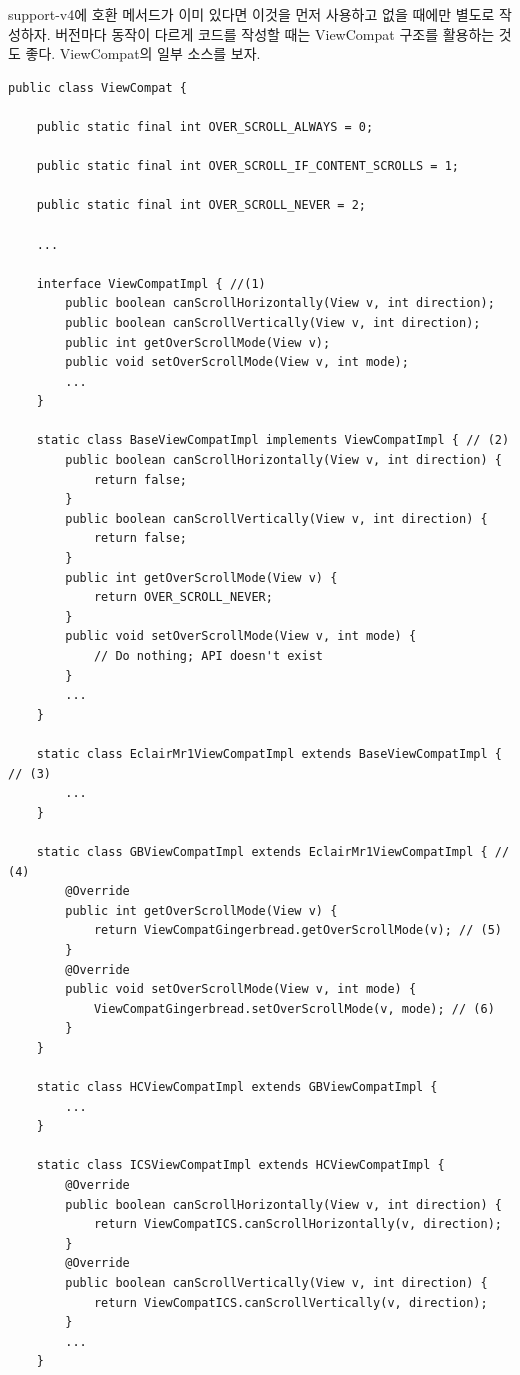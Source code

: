 support-v4에 호환 메서드가 이미 있다면 이것을 먼저 사용하고 없을 때에만 별도로 작성하자.
버전마다 동작이 다르게 코드를 작성할 때는 ViewCompat 구조를 활용하는 것도 좋다. ViewCompat의 일부 소스를 보자. 
\begin{lstlisting}[frame=single]
public class ViewCompat {
   
    public static final int OVER_SCROLL_ALWAYS = 0;

    public static final int OVER_SCROLL_IF_CONTENT_SCROLLS = 1;

    public static final int OVER_SCROLL_NEVER = 2;
    
    ...
    
    interface ViewCompatImpl { //(1)
        public boolean canScrollHorizontally(View v, int direction);
        public boolean canScrollVertically(View v, int direction);
        public int getOverScrollMode(View v);
        public void setOverScrollMode(View v, int mode);
        ...
    }

    static class BaseViewCompatImpl implements ViewCompatImpl { // (2)
        public boolean canScrollHorizontally(View v, int direction) {
            return false;
        }
        public boolean canScrollVertically(View v, int direction) {
            return false;
        }
        public int getOverScrollMode(View v) {
            return OVER_SCROLL_NEVER;
        }
        public void setOverScrollMode(View v, int mode) {
            // Do nothing; API doesn't exist
        }
        ...
    }

    static class EclairMr1ViewCompatImpl extends BaseViewCompatImpl { // (3)
        ...
    }

    static class GBViewCompatImpl extends EclairMr1ViewCompatImpl { // (4)
        @Override
        public int getOverScrollMode(View v) {
            return ViewCompatGingerbread.getOverScrollMode(v); // (5)
        }
        @Override
        public void setOverScrollMode(View v, int mode) {
            ViewCompatGingerbread.setOverScrollMode(v, mode); // (6)
        }
    }

    static class HCViewCompatImpl extends GBViewCompatImpl {
      	...
    }

    static class ICSViewCompatImpl extends HCViewCompatImpl {
        @Override
        public boolean canScrollHorizontally(View v, int direction) {
            return ViewCompatICS.canScrollHorizontally(v, direction);
        }
        @Override
        public boolean canScrollVertically(View v, int direction) {
            return ViewCompatICS.canScrollVertically(v, direction);
        }
        ...
    }


\end{lstlisting}
